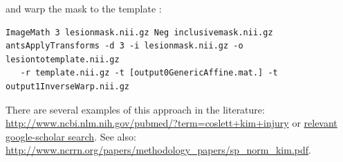 \documentclass{InsightArticle}
\begin{document}
and warp the mask to the template :
\begin{verbatim}
ImageMath 3 lesionmask.nii.gz Neg inclusivemask.nii.gz
antsApplyTransforms -d 3 -i lesionmask.nii.gz -o lesiontotemplate.nii.gz 
   -r template.nii.gz -t [output0GenericAffine.mat.] -t output1InverseWarp.nii.gz
\end{verbatim}
There are several examples of this approach in the literature:
\href{http://www.ncbi.nlm.nih.gov/pubmed/?term=coslett+kim+injury}{http://www.ncbi.nlm.nih.gov/pubmed/?term=coslett+kim+injury}
or
\href{http://scholar.google.com/scholar?q=brain+normalization+MRI+ANTs+advanced+lesion+tools+-ant&btnG=&hl=en&as_sdt=0%2C39}{relevant google-scholar search}.
See also: \href{http://www.ncrrn.org/papers/methodology\_papers/sp\_norm\_kim.pdf}{http://www.ncrrn.org/papers/methodology\_papers/sp\_norm\_kim.pdf}.
\end{document}

